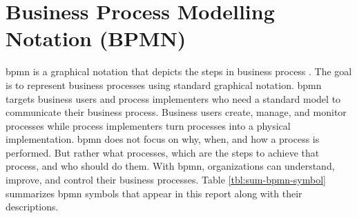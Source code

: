 \section{Business Process Modelling Notation (BPMN)}
\gls{bpmn} is a graphical notation that depicts the steps in business process \cite{bpmn_omg}.
The goal is to represent business processes using standard graphical notation.
\gls{bpmn} targets business users and process implementers who need a standard model to communicate their business process.
Business users create, manage, and monitor processes while process implementers turn processes into a physical implementation. 
\gls{bpmn} does not focus on why, when, and how a process is performed.
But rather what processes, which are the steps to achieve that process, and who should do them.
With \gls{bpmn}, organizations can understand, improve, and control their business processes.
Table \ref{tbl:sum-bpmn-symbol} summarizes \gls{bpmn} symbols that appear in this report along with their descriptions.
